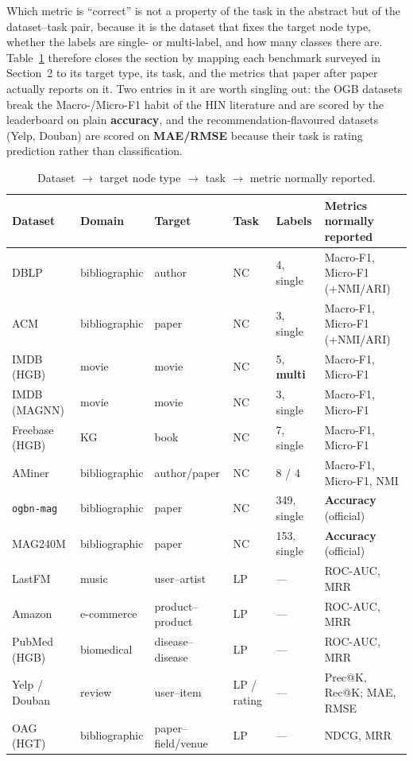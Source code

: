 Which metric is ``correct'' is not a property of the task in the abstract but of the
dataset--task pair, because it is the dataset that fixes the target node type, whether the labels
are single- or multi-label, and how many classes there are.
Table~\ref{p2:tab:summary} therefore closes the section by mapping each benchmark surveyed in
Section~2 to its target type, its task, and the metrics that paper after paper actually reports on
it. Two entries in it are worth singling out: the OGB datasets break the Macro-/Micro-F1 habit of
the HIN literature and are scored by the leaderboard on plain \textbf{accuracy}, and the
recommendation-flavoured datasets (Yelp, Douban) are scored on \textbf{MAE/RMSE} because their
task is rating prediction rather than classification.

\begin{table}[H]
\centering
\small
\caption{Dataset $\to$ target node type $\to$ task $\to$ metric normally reported.}
\label{p2:tab:summary}
\footnotesize
\setlength{\tabcolsep}{4pt}
\begin{tabular}{@{}llllll@{}}
\toprule
Dataset & Domain & Target & Task & Labels & Metrics normally reported \\
\midrule
DBLP      & bibliographic & author  & NC     & 4, single & Macro-F1, Micro-F1 (+NMI/ARI) \\
ACM       & bibliographic & paper   & NC     & 3, single & Macro-F1, Micro-F1 (+NMI/ARI) \\
IMDB (HGB)& movie         & movie   & NC     & 5, \textbf{multi} & Macro-F1, Micro-F1 \\
IMDB (MAGNN)& movie       & movie   & NC     & 3, single & Macro-F1, Micro-F1 \\
Freebase (HGB) & KG       & book    & NC     & 7, single & Macro-F1, Micro-F1 \\
AMiner    & bibliographic & author/paper & NC & 8 / 4    & Macro-F1, Micro-F1, NMI \\
\texttt{ogbn-mag} & bibliographic & paper & NC & 349, single & \textbf{Accuracy} (official) \\
MAG240M   & bibliographic & paper   & NC     & 153, single & \textbf{Accuracy} (official) \\
\midrule
LastFM    & music         & user--artist & LP & ---      & ROC-AUC, MRR \\
Amazon    & e-commerce    & product--product & LP & ---  & ROC-AUC, MRR \\
PubMed (HGB) & biomedical & disease--disease & LP & ---  & ROC-AUC, MRR \\
Yelp / Douban & review    & user--item & LP / rating & --- & Prec@K, Rec@K; MAE, RMSE \\
OAG (HGT) & bibliographic & paper--field/venue & LP & --- & NDCG, MRR \\
\bottomrule
\end{tabular}
\end{table}

